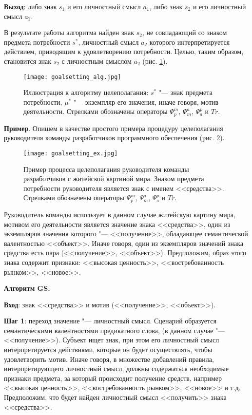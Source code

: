 \begin{appendices}
\textbf{Выход}: либо знак $s_1$ и его личностный смысл $a_1$, либо знак $s_2$ и его личностный смысл $a_2$.

В результате работы алгоритма найден знак $s_2$, не совпадающий со знаком предмета потребности $s^*$, личностный смысл $a_2$ которого интерпретируется действием, приводящим к удовлетворению потребности. Целью, таким образом, становится знак $s_2$ с личностным смыслом $a_2$ (рис. \ref{fg:goalsetting_alg}).

\begin{figure}[h]
	\centering
	\texttt{[image: goalsetting\_alg.jpg]}
	\caption[]{Иллюстрация к алгоритму целеполагания: $s^*$ "--- знак предмета потребности, $\mu^*$ "--- экземпляр его значения, иначе говоря, мотив деятельности. Стрелками обозначены операторы $\Psi_p^m$, $\Psi_m^a$, $\Psi_a^p$ и $Tr$.}
	\label{fg:goalsetting_alg}
\end{figure}

\textbf{Пример}. Опишем в качестве простого примера процедуру целеполагания руководителя команды разработчиков программного обеспечения (рис. \ref{fg:goalsetting_ex}).

\begin{figure}[h]
	\centering
	\texttt{[image: goalsetting\_ex.jpg]}
	\caption[]{Пример процесса целеполагания руководителя команды разработчиков с житейской картиной мира. Знаком предмета потребности руководителя является знак с именем <<средства>>. Стрелками обозначены операторы $\Psi_p^m$, $\Psi_m^a$, $\Psi_a^p$ и $Tr$.}
	\label{fg:goalsetting_ex}
\end{figure}

Руководитель команды использует в данном случае житейскую картину мира, мотивом его деятельности является значение знака <<средства>>, один из экземпляров значения которого "--- <<получение>>, обладающее семантической валентностью <<объект>>. Иначе говоря, один из экземпляров значений знака средства есть пара (<<получение>>, <<объект>>). Предположим, образ этого знака содержит признаки: <<высокая ценность>>, <<востребованность рынком>>, <<новое>>.

\textbf{Алгоритм GS.}

\textbf{Вход}: знак <<средства>> и мотив (<<получение>>, <<объект>>).

\textbf{Шаг 1}: переход значение "--- личностный смысл. Сценарий образуется семантическими валентностями предикатного слова, (в данном случае "--- <<получение>>). Субъект ищет знак, при этом его личностный смысл интерпретируется действиями, которые он будет осуществлять, чтобы удовлетворить мотив. Иначе говоря, в множестве добавлений правила, интерпретирующего личностный смысл, должны содержаться необходимые признаки предмета, за который происходит получение средств, например <<высокая ценность>>, <<востребованность рынком>>, <<новое>> и т.д. Предположим, что будет найден личностный смысл <<получить>> знака <<средства>>.


\end{appendices}
